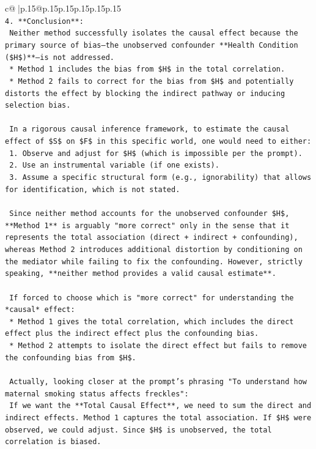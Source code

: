 \documentclass{article}
\begin{document}
{\begin{supertabular}{c@{$\;$}|p{.15\linewidth}@{}p{.15\linewidth}p{.15\linewidth}p{.15\linewidth}p{.15\linewidth}p{.15\linewidth}}
{{{\\ 
\texttt{4.  **Conclusion**:} \\
\texttt{    Neither method successfully isolates the causal effect because the primary source of bias—the unobserved confounder **Health Condition (\$H\$)**—is not addressed.} \\
\texttt{    *   Method 1 includes the bias from \$H\$ in the total correlation.} \\
\texttt{    *   Method 2 fails to correct for the bias from \$H\$ and potentially distorts the effect by blocking the indirect pathway or inducing selection bias.} \\
\\ 
\texttt{    In a rigorous causal inference framework, to estimate the causal effect of \$S\$ on \$F\$ in this specific world, one would need to either:} \\
\texttt{    1.  Observe and adjust for \$H\$ (which is impossible per the prompt).} \\
\texttt{    2.  Use an instrumental variable (if one exists).} \\
\texttt{    3.  Assume a specific structural form (e.g., ignorability) that allows for identification, which is not stated.} \\
\\ 
\texttt{    Since neither method accounts for the unobserved confounder \$H\$, **Method 1** is arguably "more correct" only in the sense that it represents the total association (direct + indirect + confounding), whereas Method 2 introduces additional distortion by conditioning on the mediator while failing to fix the confounding. However, strictly speaking, **neither method provides a valid causal estimate**.} \\
\\ 
\texttt{    If forced to choose which is "more correct" for understanding the *causal* effect:} \\
\texttt{    *   Method 1 gives the total correlation, which includes the direct effect plus the indirect effect plus the confounding bias.} \\
\texttt{    *   Method 2 attempts to isolate the direct effect but fails to remove the confounding bias from \$H\$.} \\
\\ 
\texttt{    Actually, looking closer at the prompt's phrasing "To understand how maternal smoking status affects freckles":} \\
\texttt{    If we want the **Total Causal Effect**, we need to sum the direct and indirect effects. Method 1 captures the total association. If \$H\$ were observed, we could adjust. Since \$H\$ is unobserved, the total correlation is biased.} \\
}}}
\end{supertabular}}
\end{document}
